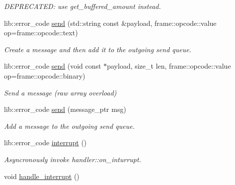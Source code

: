 \begin{DoxyCompactItemize}
\begin{DoxyCompactList}\small\item\em D\+E\+P\+R\+E\+C\+A\+T\+ED\+: use get\+\_\+buffered\+\_\+amount instead. \end{DoxyCompactList}\item 
lib\+::error\+\_\+code \hyperlink{classwebsocketpp_1_1connection_af3f96a962ed7a271a00e85ba4df2db45}{send} (std\+::string const \&payload, frame\+::opcode\+::value op=frame\+::opcode\+::text)
\begin{DoxyCompactList}\small\item\em Create a message and then add it to the outgoing send queue. \end{DoxyCompactList}\item 
lib\+::error\+\_\+code \hyperlink{classwebsocketpp_1_1connection_a607fc1d40a2cf994ccc7173a94a2774d}{send} (void const $\ast$payload, size\+\_\+t len, frame\+::opcode\+::value op=frame\+::opcode\+::binary)
\begin{DoxyCompactList}\small\item\em Send a message (raw array overload) \end{DoxyCompactList}\item 
lib\+::error\+\_\+code \hyperlink{classwebsocketpp_1_1connection_a29900da403dbafab8095c0989104be90}{send} (message\+\_\+ptr msg)
\begin{DoxyCompactList}\small\item\em Add a message to the outgoing send queue. \end{DoxyCompactList}\item 
lib\+::error\+\_\+code \hyperlink{classwebsocketpp_1_1connection_a12bbbc93d414c65492ffb2c4a12f05a8}{interrupt} ()
\begin{DoxyCompactList}\small\item\em Asyncronously invoke handler\+::on\+\_\+inturrupt. \end{DoxyCompactList}\item 
void \hyperlink{classwebsocketpp_1_1connection_a0b438ac986b73c99907515eeac6dc45f}{handle\+\_\+interrupt} ()\hypertarget{classwebsocketpp_1_1connection_a0b438ac986b73c99907515eeac6dc45f}{}\label{classwebsocketpp_1_1connection_a0b438ac986b73c99907515eeac6dc45f}


\end{DoxyCompactItemize}
